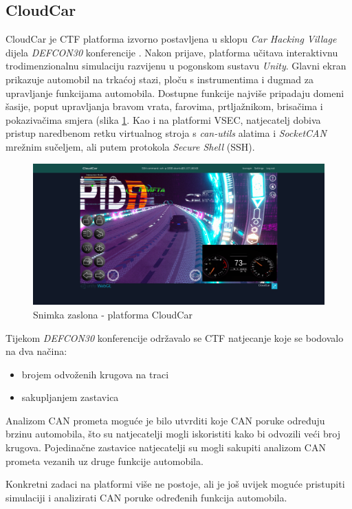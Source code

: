 \documentclass[times, utf8, diplomski, numeric]{fer}
\begin{document}
\subsection{CloudCar}
CloudCar je CTF platforma izvorno postavljena u sklopu \textit{Car Hacking Village} dijela \textit{DEFCON30} konferencije \cite{one2022cloudcar, cloudcar}. Nakon prijave, platforma učitava interaktivnu trodimenzionalnu simulaciju razvijenu u pogonskom sustavu \textit{Unity}. Glavni ekran prikazuje automobil na trkaćoj stazi, ploču s instrumentima i dugmad za upravljanje funkcijama automobila. Dostupne funkcije najviše pripadaju domeni šasije, poput upravljanja bravom vrata, farovima, prtljažnikom, brisačima i pokazivačima smjera (slika \ref{fig:cloudcar}. Kao i na platformi VSEC, natjecatelj dobiva pristup naredbenom retku virtualnog stroja s \textit{can-utils} alatima i \textit{SocketCAN} mrežnim sučeljem, ali putem protokola \textit{Secure Shell} (SSH). 

\begin{figure}[htb]
\centering
\includegraphics[width=\textwidth]{cloudcar.png}
\caption{Snimka zaslona - platforma CloudCar}
\label{fig:cloudcar}
\end{figure}

\newpage
Tijekom \textit{DEFCON30} konferencije održavalo se CTF natjecanje koje se bodovalo na dva načina: 
\begin{itemize}
    \item brojem odvoženih krugova na traci
    \item sakupljanjem zastavica 
\end{itemize}
Analizom CAN prometa moguće je bilo utvrditi koje CAN poruke određuju brzinu automobila, što su natjecatelji mogli iskoristiti kako bi odvozili veći broj krugova. Pojedinačne zastavice natjecatelji su mogli sakupiti analizom CAN prometa vezanih uz druge funkcije automobila.

Konkretni zadaci na platformi više ne postoje, ali je još uvijek moguće pristupiti simulaciji i analizirati CAN poruke određenih funkcija automobila.
\end{document}
